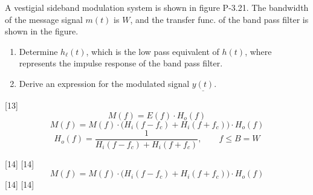 \documentclass[11pt,a4paper]{article}
\begin{document}
\begin{ornek}[3.21]
A vestigial sideband modulation system is shown in figure P-3.21. The bandwidth of the message signal $m(t)$ is $W$, and the transfer func. of the band pass filter is shown in the figure.
\begin{enumerate}
\item Determine $h_\ell(t)$, which is the low pass equivalent of $h(t)$, where represents the impulse response of the band pass filter.
\item Derive an expression for the modulated signal $\underline{y(t)}$.
\end{enumerate}
\end{ornek}
[13]
\[ M(f)=E(f)\cdot H_o(f) \]
\[ M(f)=M(f)\cdot\big(H_i(f-f_c)+H_i(f+f_c)\big)\cdot H_o(f) \]
\[ H_o(f)=\frac{1}{H_i(f-f_c)+H_i(f+f_c)},\qquad f\le B=W \]

[14]
[14]
\[ M(f)=M(f)\cdot\big(H_i(f-f_c)+H_i(f+f_c)\big)\cdot H_o(f) \]
[14]
[14]
\end{document}
